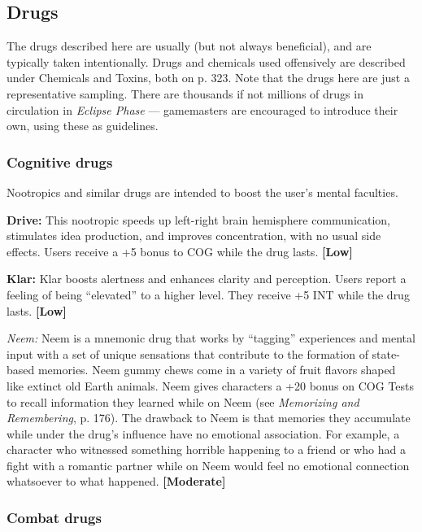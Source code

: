 \subsection{Drugs} \label{sec:drugs} 

The drugs described here are usually (but not always beneficial), and are typically taken intentionally. Drugs and chemicals used offensively are described under Chemicals and Toxins, both on p. 323. Note that the drugs here are just a representative sampling. There are thousands if not millions of drugs in circulation in \emph{Eclipse Phase} --- gamemasters are encouraged to introduce their own, using these as guidelines. 

\subsubsection{Cognitive drugs} 

Nootropics and similar drugs are intended to boost the user’s mental faculties. 

\textbf{Drive:} This nootropic speeds up left-right brain hemisphere communication, stimulates idea production, and improves concentration, with no usual side effects. Users receive a +5 bonus to COG while the drug lasts. \textbf{[Low]} 

\textbf{Klar:} Klar boosts alertness and enhances clarity and perception. Users report a feeling of being ``elevated'' to a higher level. They receive +5 INT while the drug lasts. \textbf{[Low]} 

\emph{Neem:} Neem is a mnemonic drug that works by ``tagging'' experiences and mental input with a set of unique sensations that contribute to the formation of state-based memories. Neem gummy chews come in a variety of fruit flavors shaped like extinct old Earth animals. Neem gives characters a +20 bonus on COG Tests to recall information they learned while on Neem (see \emph{Memorizing and Remembering}, p. 176). The drawback to Neem is that memories they accumulate while under the drug’s influence have no emotional association. For example, a character who witnessed something horrible happening to a friend or who had a fight with a romantic partner while on Neem would feel no emotional connection whatsoever to what happened. \textbf{[Moderate]} 

\subsubsection{Combat drugs} 

